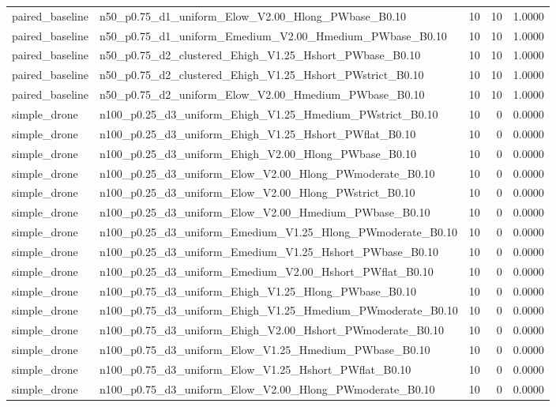 \begin{tabular}{llrrr}
paired_baseline & n50_p0.75_d1_uniform_Elow_V2.00_Hlong_PWbase_B0.10 & 10 & 10 & 1.0000 \\
paired_baseline & n50_p0.75_d1_uniform_Emedium_V2.00_Hmedium_PWbase_B0.10 & 10 & 10 & 1.0000 \\
paired_baseline & n50_p0.75_d2_clustered_Ehigh_V1.25_Hshort_PWbase_B0.10 & 10 & 10 & 1.0000 \\
paired_baseline & n50_p0.75_d2_clustered_Ehigh_V1.25_Hshort_PWstrict_B0.10 & 10 & 10 & 1.0000 \\
paired_baseline & n50_p0.75_d2_uniform_Elow_V2.00_Hmedium_PWbase_B0.10 & 10 & 10 & 1.0000 \\
simple_drone & n100_p0.25_d3_uniform_Ehigh_V1.25_Hmedium_PWstrict_B0.10 & 10 & 0 & 0.0000 \\
simple_drone & n100_p0.25_d3_uniform_Ehigh_V1.25_Hshort_PWflat_B0.10 & 10 & 0 & 0.0000 \\
simple_drone & n100_p0.25_d3_uniform_Ehigh_V2.00_Hlong_PWbase_B0.10 & 10 & 0 & 0.0000 \\
simple_drone & n100_p0.25_d3_uniform_Elow_V2.00_Hlong_PWmoderate_B0.10 & 10 & 0 & 0.0000 \\
simple_drone & n100_p0.25_d3_uniform_Elow_V2.00_Hlong_PWstrict_B0.10 & 10 & 0 & 0.0000 \\
simple_drone & n100_p0.25_d3_uniform_Elow_V2.00_Hmedium_PWbase_B0.10 & 10 & 0 & 0.0000 \\
simple_drone & n100_p0.25_d3_uniform_Emedium_V1.25_Hlong_PWmoderate_B0.10 & 10 & 0 & 0.0000 \\
simple_drone & n100_p0.25_d3_uniform_Emedium_V1.25_Hshort_PWbase_B0.10 & 10 & 0 & 0.0000 \\
simple_drone & n100_p0.25_d3_uniform_Emedium_V2.00_Hshort_PWflat_B0.10 & 10 & 0 & 0.0000 \\
simple_drone & n100_p0.75_d3_uniform_Ehigh_V1.25_Hlong_PWbase_B0.10 & 10 & 0 & 0.0000 \\
simple_drone & n100_p0.75_d3_uniform_Ehigh_V1.25_Hmedium_PWmoderate_B0.10 & 10 & 0 & 0.0000 \\
simple_drone & n100_p0.75_d3_uniform_Ehigh_V2.00_Hshort_PWmoderate_B0.10 & 10 & 0 & 0.0000 \\
simple_drone & n100_p0.75_d3_uniform_Elow_V1.25_Hmedium_PWbase_B0.10 & 10 & 0 & 0.0000 \\
simple_drone & n100_p0.75_d3_uniform_Elow_V1.25_Hshort_PWflat_B0.10 & 10 & 0 & 0.0000 \\
simple_drone & n100_p0.75_d3_uniform_Elow_V2.00_Hlong_PWmoderate_B0.10 & 10 & 0 & 0.0000 \\

\end{tabular}
